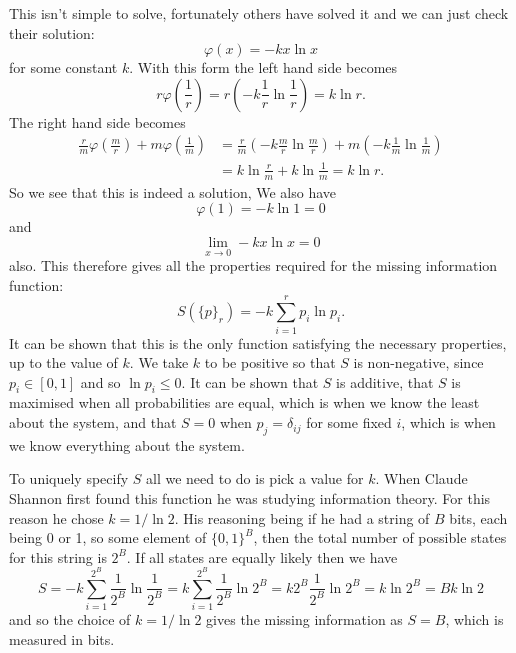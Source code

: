 \documentclass[fleqn]{NotesClass}
\begin{document}
    This isn't simple to solve, fortunately others have solved it and we can just check their solution:
    \begin{equation}
        \varphi(x) = -kx\ln x
    \end{equation}
    for some constant \(k\).
    With this form the left hand side becomes
    \begin{equation}
        r\varphi\left( \frac{1}{r} \right) = r\left( -k\frac{1}{r}\ln\frac{1}{r} \right) = k\ln r.
    \end{equation}
    The right hand side becomes
    \begin{align}
        \frac{r}{m} \varphi\left( \frac{m}{r} \right) + m \varphi\left( \frac{1}{m} \right)&= \frac{r}{m}\left( -k\frac{m}{r}\ln\frac{m}{r} \right) + m\left( -k\frac{1}{m}\ln\frac{1}{m} \right)\\
        &= k\ln\frac{r}{m} + k\ln\frac{1}{m} = k\ln r.
    \end{align}
    So we see that this is indeed a solution,
    We also have
    \begin{equation}
        \varphi(1) = -k\ln 1 = 0 
    \end{equation}
    and
    \begin{equation}
        \lim_{x\to 0} -kx\ln x = 0
    \end{equation}
    also.
    This therefore gives all the properties required for the missing information function:
    \begin{equation}
        S(\{p\}_r) = -k\sum_{i=1}^{r} p_i\ln p_i.
    \end{equation}
    It can be shown that this is the only function satisfying the necessary properties, up to the value of \(k\).
    We take \(k\) to be positive so that \(S\) is non-negative, since \(p_i \in [0, 1]\) and so \(\ln p_i \le 0\).
    It can be shown that \(S\) is additive, that \(S\) is maximised when all probabilities are equal, which is when we know the least about the system, and that \(S = 0\) when \(p_j = \delta_{ij}\) for some fixed \(i\), which is when we know everything about the system.
    
    To uniquely specify \(S\) all we need to do is pick a value for \(k\).
    When Claude Shannon first found this function he was studying information theory.
    For this reason he chose \(k = 1/\ln 2\).
    His reasoning being if he had a string of \(B\) bits, each being 0 or 1, so some element of \(\{0, 1\}^{B}\), then the total number of possible states for this string is \(2^{B}\).
    If all states are equally likely then we have
    \begin{equation}
        S = -k\sum_{i=1}^{2^B} \frac{1}{2^{B}} \ln \frac{1}{2^{B}} = k\sum_{i=1}^{2^B} \frac{1}{2^B}\ln 2^B = k2^B\frac{1}{2^B}\ln 2^B = k\ln 2^B = Bk\ln 2
    \end{equation}
    and so the choice of \(k = 1/\ln 2\) gives the missing information as \(S = B\), which is measured in bits.
    
\end{document}
